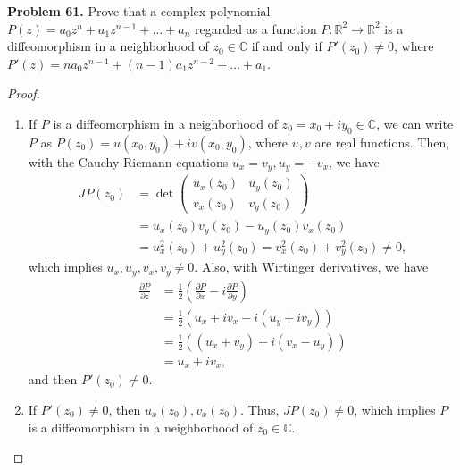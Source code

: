 \documentclass[12pt,leqno]{amsart}
\theoremstyle{definition}
\begin{document}
\noindent
{\bf Problem 61.}
Prove that a complex polynomial
$P(z)=a_0z^n+a_1 z^{n-1} + \ldots + a_n$
regarded as a function
$P:\mathbb{R}^2\to\mathbb{R}^2$ is a diffeomorphism in a neighborhood of $z_0\in\mathbb{C}$
if and only if $P'(z_0)\neq 0$, where
$P'(z)=na_0 z^{n-1} + (n-1)a_1 z^{n-2} + \ldots + a_1$.
\begin{proof}
~\begin{enumerate}[label=(\arabic*)]
    \item If $P$ is a diffeomorphism in a neighborhood of $z_0 = x_0 + i y_0 \in\mathbb{C}$, we can write $P$ as $P(z_0) = u(x_0, y_0) + i v(x_0, y_0)$, where $u,v$ are real functions. Then, with the Cauchy-Riemann equations $u_x = v_y, u_y = -v_x$, we have
    \begin{align*}
        JP(z_0) & = \det \begin{pmatrix}
        u_x(z_0) & u_y(z_0) \\
        v_x(z_0) & v_y(z_0)
        \end{pmatrix} \\
        & = u_x(z_0) v_y(z_0) - u_y(z_0) v_x(z_0) \\
        & = u_x^2(z_0) + u_y^2(z_0) = v_x^2(z_0) + v_y^2(z_0) \neq 0,
    \end{align*}
    which implies $u_x, u_y, v_x, v_y \neq 0$. Also, with Wirtinger derivatives, we have 
    \begin{align*}
        \frac{\partial P}{\partial z} &= \frac12\left(\frac{\partial P}{\partial x} - i\frac{\partial P}{\partial y}\right)\\
        &= \frac12\left(u_x+iv_x - i(u_y+iv_y)\right)\\
        &= \frac12\left((u_x+v_y) + i(v_x-u_y)\right)\\
        &= u_x + iv_x,
    \end{align*}
    and then $P'(z_0) \neq 0$.
    
    \item If $P'(z_0) \neq 0$, then $u_x(z_0), v_x(z_0)$. Thus, $JP(z_0) \neq 0$, which implies $P$ is a diffeomorphism in a neighborhood of $z_0 \in\mathbb{C}$.
\end{enumerate}
\end{proof}

\medskip
\end{document}
